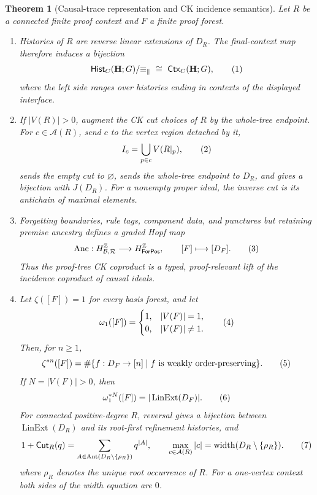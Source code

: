 \documentclass[10pt,a4paper]{article}
\theoremstyle{plain}
\newtheorem{theorem}{Theorem}[section]
\theoremstyle{definition}
\theoremstyle{remark}
\newcommand{\Base}{\mathcal B}
\newcommand{\Rules}{\mathcal R}
\newcommand{\Ctx}{\mathsf{Ctx}}
\newcommand{\eqtag}{\refstepcounter{equation}\tag{\theequation}}
\begin{document}
\begin{theorem}[Causal-trace representation and CK incidence semantics]
\label{thm:causal-ck-semantics}
Let \(R\) be a connected finite proof context and \(F\) a finite proof
forest.
\begin{enumerate}[label=(\roman*)]
\item Histories of \(R\) are reverse linear extensions of \(D_R\).  The
final-context map therefore induces a bijection
\[
 \mathsf{Hist}_{C}(\mathbf H;G)/{\equiv_{\parallel}}
       \ \cong\ \Ctx_C(\mathbf H;G),
\eqtag\label{eq:history-trace-quotient}
\]
where the left side ranges over histories ending in contexts of the
displayed interface.
\item If \(|V(R)|>0\), augment the CK cut choices of \(R\) by the whole-tree
endpoint.  For \(c\in\mathcal A(R)\), send \(c\) to the vertex region
detached by it,
\[
 I_c=\bigcup_{p\in c}V(R|_p),
\eqtag\label{eq:cut-ancestry-ideal}
\]
sends the empty cut to \(\varnothing\), sends the whole-tree endpoint to
\(D_R\), and gives a bijection with \(J(D_R)\).  For a nonempty proper
ideal, the inverse cut is its antichain of maximal elements.
\item Forgetting boundaries, rule tags, component data, and punctures but
retaining premise ancestry defines a graded Hopf map
\[
 \operatorname{Anc}:H^{\mathbb Z}_{\Base,\Rules}
      \longrightarrow H^{\mathbb Z}_{\mathsf{ForPos}},
 \qquad [F]\longmapsto[D_F].
\eqtag\label{eq:ancestry-hopf-map}
\]
Thus the proof-tree CK coproduct is a typed, proof-relevant lift of the
incidence coproduct of causal ideals.
\item Let \(\zeta([F])=1\) for every basis forest, and let
\[
 \omega_1([F])=
 \begin{cases}
 1,&|V(F)|=1,\\
 0,&|V(F)|\ne1.
 \end{cases}
\eqtag\label{eq:causal-characters}
\]
Then, for \(n\ge1\),
\[
 \zeta^{*n}([F])
   =\#\{f:D_F\to[n]\mid f\text{ is weakly order-preserving}\}.
\eqtag\label{eq:ck-order-polynomial}
\]
If \(N=|V(F)|>0\), then
\[
 \omega_1^{*N}([F])
       =|\operatorname{LinExt}(D_F)|.
\eqtag\label{eq:ck-linear-extension-count}
\]
For connected positive-degree \(R\), reversal gives a bijection between
\(\operatorname{LinExt}(D_R)\) and its root-first refinement histories, and
\[
 1+\mathsf{Cut}_R(q)
  =\sum_{A\in\operatorname{Ant}(D_R\setminus\{\rho_R\})}q^{|A|},
 \qquad
 \max_{c\in\mathcal A(R)}|c|
  =\operatorname{width}(D_R\setminus\{\rho_R\}).
\eqtag\label{eq:ck-causal-width}
\]
where \(\rho_R\) denotes the unique root occurrence of \(R\).
For a one-vertex context both sides of the width equation are \(0\).
\end{enumerate}
\end{theorem}
\end{document}

